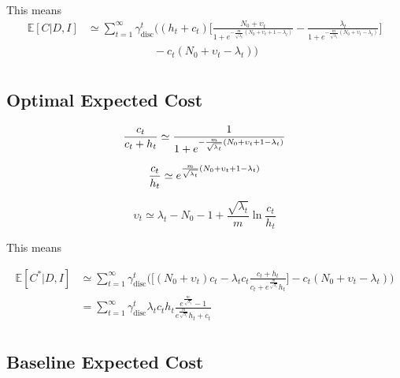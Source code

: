 This means
\begin{equation}
	\begin{split}
		\mathbb{E}[C|D,I] &\simeq  \sum_{t=1}^{\infty} \gamma_{\text{disc}}^{t} \bigg( 
		(h_t+c_t)\bigg[\frac{N_0 + \upsilon_t}{1+e^{-\frac{m}{\sqrt{\lambda_t}}(N_0+\upsilon_t+1-\lambda_t)}}- \frac{\lambda_t}{1+e^{-\frac{m}{\sqrt{\lambda_t}}(N_0+\upsilon_t-\lambda_t)}}\bigg]\\
		&\qquad\qquad\qquad
		- c_t(N_0 + \upsilon_t-\lambda_t)\bigg)\\
	\end{split}
\end{equation}

\subsection{Optimal Expected Cost}

\begin{equation}
	\frac{c_t}{c_t+h_t}\simeq\frac{1}{1+e^{-\frac{m}{\sqrt{\lambda_t}}(N_0+\upsilon_t+1-\lambda_t)}}\\
\end{equation}

\begin{equation}
	\frac{c_t}{h_t}\simeq e^{\frac{m}{\sqrt{\lambda_t}}(N_0+\upsilon_t+1-\lambda_t)}\\
\end{equation}

\begin{equation}
	\upsilon_t\simeq \lambda_t-N_0-1+\frac{\sqrt{\lambda_t}}{m}\ln\frac{c_t}{h_t} 
\end{equation}

This means

\begin{equation}
	\begin{split}
		\mathbb{E}[C^*|D,I] &\simeq \sum_{t=1}^{\infty} \gamma_{\text{disc}}^{t} \bigg( 
		\bigg[(N_0 + \upsilon_t)c_t- \lambda_tc_t\frac{c_t+h_t}{c_t+e^{\frac{m}{\sqrt{\lambda_t}}}h_t}
		\bigg]- c_t(N_0 + \upsilon_t-\lambda_t)\bigg)\\
		&= \sum_{t=1}^{\infty} \gamma_{\text{disc}}^{t} \lambda_tc_th_t\frac{e^{\frac{m}{\sqrt{\lambda_t}}}-1}{e^{\frac{m}{\sqrt{\lambda_t}}}h_t+c_t}\\
	\end{split}
\end{equation}

\subsection{Baseline Expected Cost}

